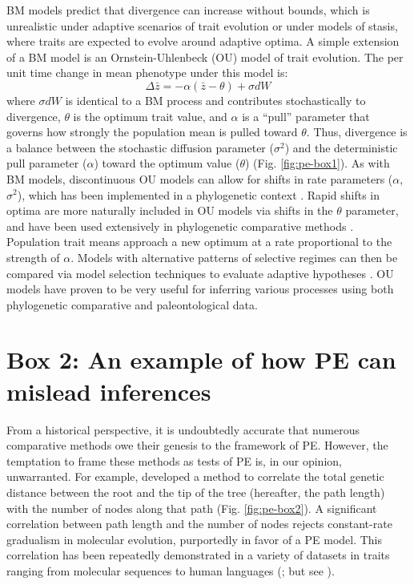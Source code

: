 BM models predict that divergence can increase without bounds, which is unrealistic under adaptive scenarios of trait evolution or under models of stasis, where traits are expected to evolve around adaptive optima. A simple extension of a BM model is an Ornstein-Uhlenbeck (OU) model of trait evolution. The per unit time change in mean phenotype under this model is:
\begin{equation}
\Delta \bar{z} = -\alpha(\bar{z}-\theta)+\sigma dW
\end{equation}
where $\sigma dW$ is identical to a BM process and contributes stochastically to divergence,  $\theta$ is the optimum trait value, and $\alpha$ is a ``pull'' parameter that governs how strongly the population mean is pulled toward $\theta$. Thus, divergence is a balance between the stochastic diffusion parameter ($\sigma^2$) and the deterministic pull parameter ($\alpha$) toward the optimum value ($\theta$) (Fig. \ref{fig:pe-box1}). As with BM models, discontinuous OU models can allow for shifts in rate parameters ($\alpha$, $\sigma^2$), which has been implemented in a phylogenetic context \citep{Beaulieu2012}. Rapid shifts in optima are more naturally included in OU models via shifts in the $\theta$ parameter, and have been used extensively in phylogenetic comparative methods \citep{Hansen1997, ButlerKing2004, Beaulieu2012}. Population trait means approach a new optimum at a rate proportional to the strength of $\alpha$. Models with alternative patterns of selective regimes can then be compared via model selection techniques to evaluate adaptive hypotheses \citep{ButlerKing2004}. OU models have proven to be very useful for inferring various processes using both phylogenetic comparative \citep{Hansen2008, Mahler2013Science} and paleontological \citep{Hunt2008, Reitan2012} data.


\section{Box 2: An example of how PE can mislead inferences}
From a historical perspective, it is undoubtedly accurate that numerous comparative methods owe their genesis to the framework of PE. However, the temptation to frame these methods as tests of PE is, in our opinion, unwarranted. For example, \citet{Webster2003} developed a method to correlate the total genetic distance between the root and the tip of the tree (hereafter, the path length) with the number of nodes along that path (Fig. \ref{fig:pe-box2}). A significant correlation between path length and the number of nodes rejects constant-rate gradualism in molecular evolution, purportedly in favor of a PE model. This correlation has been repeatedly demonstrated in a variety of datasets in traits ranging from molecular sequences to human languages (\citealt{Webster2003, Pagel2006, Atkinson2008, Lanfear2010}; but see \citealt{Goldie2011}).


